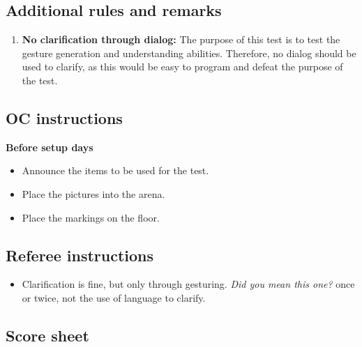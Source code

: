 %
%
\subsection{Additional rules and remarks}
\begin{enumerate}
	\item \textbf{No clarification through dialog:} The purpose of this test is to test the gesture generation and understanding abilities. Therefore, no dialog should be used to clarify, as this would be easy to program and defeat the purpose of the test.

\end{enumerate}

\subsection{OC instructions}

\textbf{Before setup days}
\begin{itemize}
	\item Announce the items to be used for the test.
  \item Place the pictures into the arena.
  \item Place the markings on the floor.
\end{itemize}

\subsection{Referee instructions}
\begin{itemize}
	\item Clarification is fine, but only through gesturing. \textit{Did you mean this one?} once or twice, not the use of language to clarify.
\end{itemize}


\newpage
\subsection{Score sheet}


